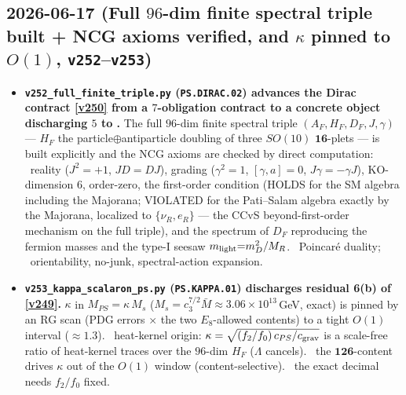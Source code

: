 \subsection*{2026-06-17 (Full $96$-dim finite spectral triple built + NCG axioms verified, and $\kappa$ pinned to $O(1)$, \texttt{v252}--\texttt{v253})}
\begin{itemize}
\item \textbf{\texttt{v252\_full\_finite\_triple.py} (\texttt{PS.DIRAC.02}) advances the Dirac contract
  \vref{v250} from a $7$-obligation contract to a concrete object discharging $5$ to \mE.} The full
  $96$-dim finite spectral triple $(A_F,H_F,D_F,J,\gamma)$ --- $H_F$ the particle$\oplus$antiparticle
  doubling of three $SO(10)$ $\mathbf{16}$-plets --- is built explicitly and the NCG axioms are checked by
  direct computation: \mE\ reality ($J^2{=}{+}1$, $JD{=}DJ$), grading ($\gamma^2{=}1$, $[\gamma,a]{=}0$,
  $J\gamma{=}{-}\gamma J$), KO-dimension $6$, order-zero, the first-order condition (HOLDS for the SM algebra
  including the Majorana; VIOLATED for the Pati--Salam algebra exactly by the Majorana, localized to
  $\{\nu_R,e_R\}$ --- the CCvS beyond-first-order mechanism on the full triple), and the spectrum of $D_F$
  reproducing the fermion masses and the type-I seesaw $m_{\rm light}{=}m_D^2/M_R$. \mC\ Poincar\'e duality;
  \mO\ orientability, no-junk, spectral-action expansion.
\item \textbf{\texttt{v253\_kappa\_scalaron\_ps.py} (\texttt{PS.KAPPA.01}) discharges residual 6(b) of
  \vref{v249}.} $\kappa$ in $M_{PS}=\kappa\,M_s$ ($M_s=c_3^{7/2}\bar M\approx3.06{\times}10^{13}$\,GeV, exact)
  is pinned by an RG scan (PDG errors $\times$ the two $E_8$-allowed contents) to a tight $O(1)$ interval
  ($\approx1.3$). \mC\ heat-kernel origin: $\kappa=\sqrt{(f_2/f_0)\,c_{PS}/c_{\rm grav}}$ is a scale-free
  ratio of heat-kernel traces over the $96$-dim $H_F$ ($\Lambda$ cancels). \mX\ the $\mathbf{126}$-content
  drives $\kappa$ out of the $O(1)$ window (content-selective). \mO\ the exact decimal needs $f_2/f_0$ fixed.
\end{itemize}

